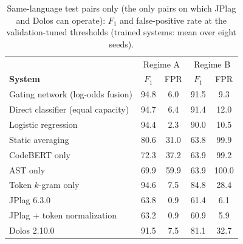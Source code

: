 \begin{table}[t]
\centering
\caption{Same-language test pairs only (the only pairs on which JPlag and Dolos can operate): $F_1$ and false-positive rate at the validation-tuned thresholds (trained systems: mean over eight seeds).}
\label{tab:same-language}
\footnotesize
\begin{tabular}{l|cc|cc}
\toprule
 & \multicolumn{2}{c|}{Regime A} & \multicolumn{2}{c}{Regime B} \\
\textbf{System} & $F_1$ & FPR & $F_1$ & FPR \\
\midrule
Gating network (log-odds fusion) & 94.8 & 6.0 & 91.5 & 9.3 \\
Direct classifier (equal capacity) & 94.7 & 6.4 & 91.4 & 12.0 \\
Logistic regression & 94.4 & 2.3 & 90.0 & 10.5 \\
Static averaging & 80.6 & 31.0 & 63.8 & 99.9 \\
CodeBERT only & 72.3 & 37.2 & 63.9 & 99.2 \\
AST only & 69.9 & 59.9 & 63.9 & 100.0 \\
Token $k$-gram only & 94.6 & 7.5 & 84.8 & 28.4 \\
JPlag 6.3.0 & 63.8 & 0.9 & 61.4 & 6.1 \\
JPlag + token normalization & 63.2 & 0.9 & 60.9 & 5.9 \\
Dolos 2.10.0 & 91.5 & 7.5 & 81.1 & 32.7 \\
\bottomrule
\end{tabular}
\end{table}